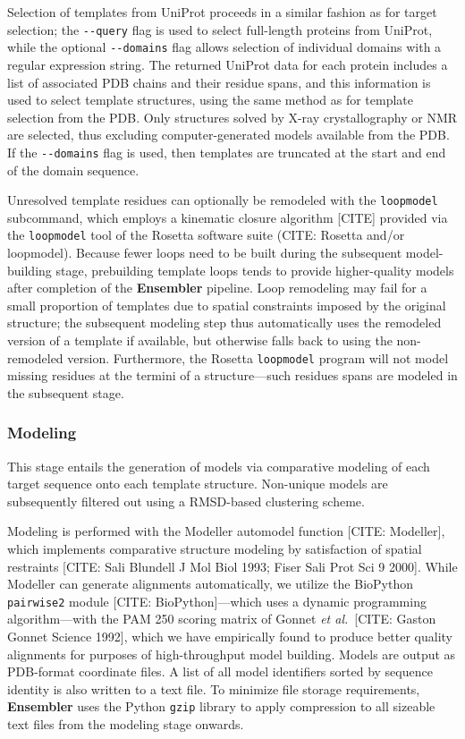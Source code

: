 \documentclass[aps,pre,twocolumn,nofootinbib,superscriptaddress,linenumbers]{revtex4-1}
\begin{document}
Selection of templates from UniProt proceeds in a similar fashion as for target selection; the {\tt -{}-query} flag is used to select full-length proteins from UniProt, while the optional {\tt -{}-domains} flag allows selection of individual domains with a regular expression string.
The returned UniProt data for each protein includes a list of associated PDB chains and their residue spans, and this information is used to select template structures, using the same method as for template selection from the PDB.
Only structures solved by X-ray crystallography or NMR are selected, thus excluding computer-generated models available from the PDB.
If the {\tt -{}-domains} flag is used, then templates are truncated at the start and end of the domain sequence.

Unresolved template residues can optionally be remodeled with the {\tt loopmodel} subcommand, which employs a kinematic closure algorithm {\color{red}[CITE]} provided via the {\tt loopmodel} tool of the Rosetta software suite (CITE: Rosetta and/or loopmodel).
Because fewer loops need to be built during the subsequent model-building stage, prebuilding template loops tends to provide higher-quality models after completion of the {\bf Ensembler} pipeline.
Loop remodeling may fail for a small proportion of templates due to spatial constraints imposed by the original structure; the subsequent modeling step thus automatically uses the remodeled version of a template if available, but otherwise falls back to using the non-remodeled version.
Furthermore, the Rosetta {\tt loopmodel} program will not model missing residues at the termini of a structure---such residues spans are modeled in the subsequent stage.

\subsubsection*{Modeling}

This stage entails the generation of models via comparative modeling of each target sequence onto each template structure. Non-unique models are subsequently filtered out using a RMSD-based clustering scheme.

Modeling is performed with the Modeller automodel function {\color{red}[CITE: Modeller]}, which implements comparative structure modeling by satisfaction of spatial restraints {\color{red}[CITE: Sali Blundell J Mol Biol 1993; Fiser Sali Prot Sci 9 2000]}.
While Modeller can generate alignments automatically, we utilize the BioPython {\tt pairwise2} module [CITE: BioPython]---which uses a dynamic programming algorithm---with the PAM 250 scoring matrix of Gonnet \textit{et al.}~{\color{red}[CITE: Gaston Gonnet Science 1992]}, which we have empirically found to produce better quality alignments for purposes of high-throughput model building.
Models are output as PDB-format coordinate files.
A list of all model identifiers sorted by sequence identity is also written to a text file.
To minimize file storage requirements, {\bf Ensembler} uses the Python {\tt gzip} library to apply compression to all sizeable text files from the modeling stage onwards.
\end{document}
